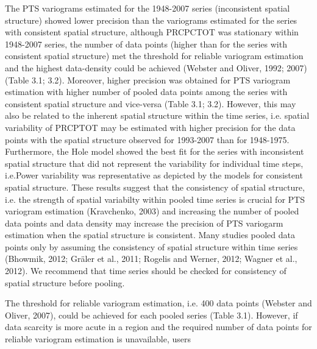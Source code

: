 The PTS variograms estimated for the 1948-2007 series (inconsistent spatial structure) showed lower precision than the variograms estimated for the series with consistent spatial structure, although PRCPCTOT was stationary within 1948-2007 series, the number of data points (higher than for the series with consistent spatial structure) met the threshold for reliable variogram estimation and the highest data-density could be achieved (Webster and Oliver, 1992; 2007) (Table 3.1; 3.2). Moreover, higher precision was obtained for PTS variogram estimation with higher number of pooled data points among the series with consistent spatial structure and vice-versa (Table 3.1; 3.2). However, this may also be related to the inherent spatial structure within the time series, i.e. spatial variability of PRCPTOT may be estimated with higher precision for the data points with the spatial structure observed for 1993-2007 than for 1948-1975. Furthermore, the Hole model showed the best fit for the series with inconsistent spatial structure that did not represent the variability for individual time steps, i.e.Power variability was representative as depicted by the models for consistent spatial structure. These results suggest that the consistency of spatial structure, i.e. the strength of spatial variabilty within pooled time series is crucial for PTS variogram estimation (Kravchenko, 2003) and increasing the number of pooled data points and data density may increase the precision of PTS variogarm estimation when the spatial structure is consistent. Many studies pooled data points only by assuming the consistency of spatial structure within time series (Bhowmik, 2012; Gräler et al., 2011; Rogelis and Werner, 2012; Wagner et al., 2012). We recommend that time series should be checked for consistency of spatial structure before pooling.

The threshold for reliable variogram estimation, i.e. 400 data points (Webster and Oliver, 2007), could be achieved for each pooled series (Table 3.1). However, if data scarcity is more acute in a region and the required number of data points for reliable variogram estimation is unavailable, users

\clearpage

